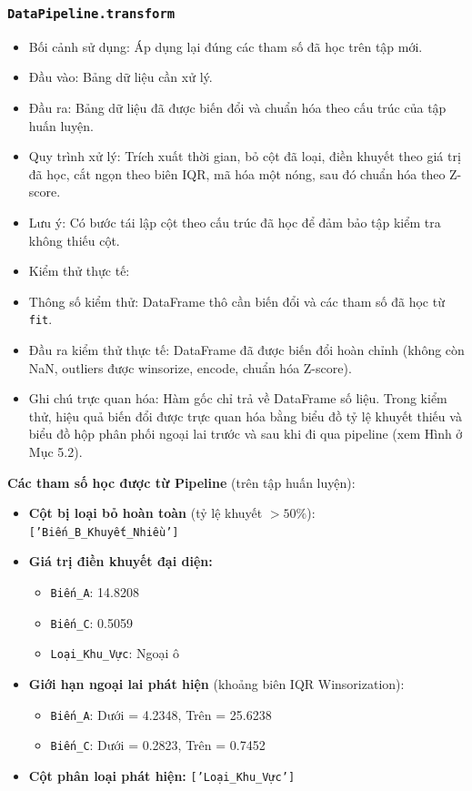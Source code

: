 \documentclass[a4paper]{article}
\newcommand{\code}[1]{\colorbox{light-gray}{\texttt{#1}}}
\begin{document}
\subsubsection{\code{DataPipeline.transform}}
\begin{itemize}[leftmargin=*]
    \item Bối cảnh sử dụng: Áp dụng lại đúng các tham số đã học trên tập mới.
    \item Đầu vào: Bảng dữ liệu cần xử lý.
    \item Đầu ra: Bảng dữ liệu đã được biến đổi và chuẩn hóa theo cấu trúc của tập huấn luyện.
    \item Quy trình xử lý: Trích xuất thời gian, bỏ cột đã loại, điền khuyết theo giá trị đã học, cắt ngọn theo biên IQR, mã hóa một nóng, sau đó chuẩn hóa theo Z-score.
    \item Lưu ý: Có bước tái lập cột theo cấu trúc đã học để đảm bảo tập kiểm tra không thiếu cột.
    \item Kiểm thử thực tế:
    \item Thông số kiểm thử: DataFrame thô cần biến đổi và các tham số đã học từ \texttt{fit}.
    \item Đầu ra kiểm thử thực tế: DataFrame đã được biến đổi hoàn chỉnh (không còn NaN, outliers được winsorize, encode, chuẩn hóa Z-score).
    \item Ghi chú trực quan hóa: Hàm gốc chỉ trả về DataFrame số liệu. Trong kiểm thử, hiệu quả biến đổi được trực quan hóa bằng biểu đồ tỷ lệ khuyết thiếu và biểu đồ hộp phân phối ngoại lai trước và sau khi đi qua pipeline (xem Hình ở Mục 5.2).
\end{itemize}
\begin{mdframed}[backgroundcolor=light-gray, roundcorner=5pt, hidealllines=true]
\textbf{Các tham số học được từ Pipeline} (trên tập huấn luyện):
\begin{itemize}[leftmargin=*]
    \item \textbf{Cột bị loại bỏ hoàn toàn} (tỷ lệ khuyết $> 50\%$): \texttt{['Biến\_B\_Khuyết\_Nhiều']}
    \item \textbf{Giá trị điền khuyết đại diện:}
    \begin{itemize}
        \item \texttt{Biến\_A}: 14.8208
        \item \texttt{Biến\_C}: 0.5059
        \item \texttt{Loại\_Khu\_Vực}: Ngoại ô
    \end{itemize}
    \item \textbf{Giới hạn ngoại lai phát hiện} (khoảng biên IQR Winsorization):
    \begin{itemize}
        \item \texttt{Biến\_A}: Dưới = 4.2348, Trên = 25.6238
        \item \texttt{Biến\_C}: Dưới = 0.2823, Trên = 0.7452
    \end{itemize}
    \item \textbf{Cột phân loại phát hiện:} \texttt{['Loại\_Khu\_Vực']}
\end{itemize}
\end{mdframed}
\end{document}
